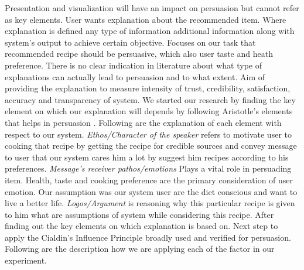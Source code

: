 Presentation and visualization will have an impact on persuasion but cannot refer as key elements. User wants explanation about the recommended item. Where explanation is defined any type of information additional information along with system’s output to achieve certain objective. Focuses on our task that recommended recipe should be persuasive, which also user taste and heath preference. There is no clear indication in literature about what type of explanations can actually lead to persuasion and to what extent. Aim of providing the explanation to measure intensity of trust, credibility, satisfaction, accuracy and transparency of system. We started our research by finding the key element on which our explanation will depends by following Aristotle’s elements that helps in persuasion \cite{gkika2014persuasive}. Following are the explanation of each element with respect to our system. \textit{Ethos/Character of the speaker} refers to motivate user to cooking that recipe by getting the recipe for credible sources and convey message to user that our system cares him a lot by suggest him recipes according to his preferences. \textit{Message’s receiver pathos/emotions} Plays a vital role in persuading item. Health, taste and cooking preference are the primary consideration of user emotion. Our assumption was our system user are the diet conscious and want to live a better life. \textit{Logos/Argument} is reasoning why this particular recipe is given to him what are assumptions of system while considering this recipe. After finding out the key elements on which explanation is based on. Next step to apply the Cialdin’s Influence Principle\cite{cialdini2009influence} broadly used and verified for persuasion. Following are the description how we are applying each of the factor in our experiment.
  
